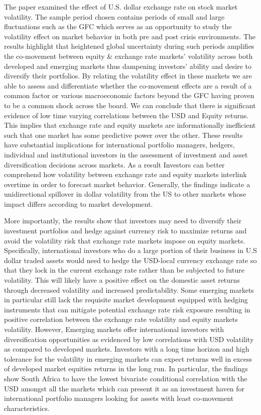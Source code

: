 \documentclass[11pt,preprint, authoryear]{elsarticle}
\numberwithin{equation}{section}
\numberwithin{figure}{section}
\numberwithin{table}{section}
\begin{document}
The paper examined the effect of U.S. dollar exchange rate on stock
market volatility. The sample period chosen contains periods of small
and large fluctuations such as the GFC which serves as an opportunity to
study the volatility effect on market behavior in both pre and post
crisis environments. The results highlight that heightened global
uncertainty during such periods amplifies the co-movement between equity
\& exchange rate markets' volatility across both developed and emerging
markets thus dampening investors' ability and desire to diversify their
portfolios. By relating the volatility effect in these markets we are
able to assess and differentiate whether the co-movement effects are a
result of a common factor or various macroeconomic factors beyond the
GFC having proven to be a common shock across the board. We can conclude
that there is significant evidence of low time varying correlations
between the USD and Equity returns. This implies that exchange rate and
equity markets are informationally inefficient such that one market has
some predictive power over the other. These results have substantial
implications for international portfolio managers, hedgers, individual
and institutional investors in the assessment of investment and asset
diversification decisions across markets. As a result Investors can
better comprehend how volatility between exchange rate and equity
markets interlink overtime in order to forecast market behavior.
Generally, the findings indicate a unidirectional spillover in dollar
volatility from the US to other markets whose impact differs according
to market development.

More importantly, the results show that investors may need to diversify
their investment portfolios and hedge against currency risk to maximize
returns and avoid the volatility risk that exchange rate markets impose
on equity markets. Specifically, international investors who do a large
portion of their business in U.S dollar traded assets would need to
hedge the USD-local currency exchange rate so that they lock in the
current exchange rate rather than be subjected to future volatility.
This will likely have a positive effect on the domestic asset returns
through decreased volatility and increased predictability. Some emerging
markets in particular still lack the requisite market development
equipped with hedging instruments that can mitigate potential exchange
rate risk exposure resulting in positive correlation between the
exchange rate volatility and equity markets volatility. However,
Emerging markets offer international investors with diversification
opportunities as evidenced by low correlations with USD volatility as
compared to developed markets. Investors with a long time horizon and
high tolerance for the volatility in emerging markets can expect returns
well in excess of developed market equities returns in the long run. In
particular, the findings show South Africa to have the lowest bivariate
conditional correlation with the USD amongst all the markets which can
present it as an investment haven for international portfolio managers
looking for assets with least co-movement characteristics.
\end{document}
